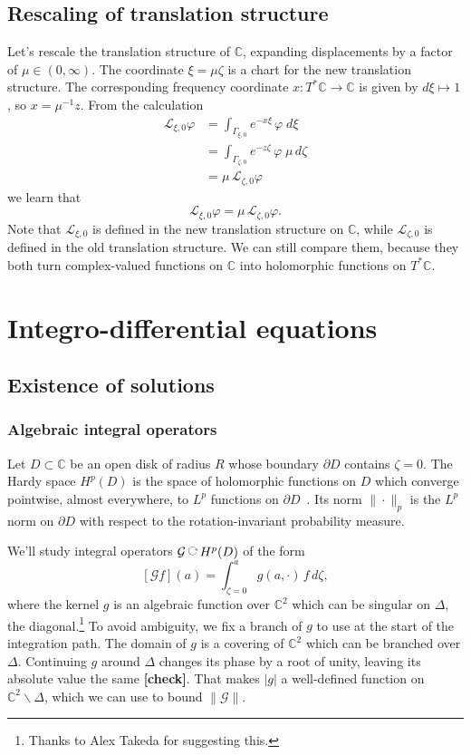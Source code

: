 \documentclass{article}
\theoremstyle{plain}
\newcommand{\maps}{\colon}
\newcommand{\acts}{\mathbin{\raisebox{\depth}{\rotatebox{-90}{$\circlearrowright$}}}}
\newcommand{\C}{\mathbb{C}}
\newcommand{\laplace}{\mathcal{L}}
\begin{document}
\subsection{Rescaling of translation structure}
Let's rescale the translation structure of $\C$, expanding displacements by a factor of $\mu \in (0, \infty)$. The coordinate $\xi = \mu\zeta$ is a chart for the new translation structure. The corresponding frequency coordinate $x \maps T^*\C \to \C$ is given by $d\xi \mapsto 1$, so $x = \mu^{-1} z$. From the calculation
\begin{align*}
\laplace_{\xi, 0} \varphi & = \int_{\Gamma_{\xi, 0}} e^{-x\xi}\,\varphi\;d\xi \\
& = \int_{\Gamma_{\zeta, 0}} e^{-z \zeta}\,\varphi\;\mu\,d\zeta \\
& = \mu\,\laplace_{\zeta, 0} \varphi
\end{align*}
we learn that
\[ \laplace_{\xi, 0} \varphi = \mu\,\laplace_{\zeta, 0} \varphi. \]
Note that $\laplace_{\xi, 0}$ is defined in the new translation structure on $\C$, while $\laplace_{\zeta, 0}$ is defined in the old translation structure. We can still compare them, because they both turn complex-valued functions on $\C$ into holomorphic functions on $T^*\C$.
\section{Integro-differential equations}
\subsection{Existence of solutions}
\subsubsection{Algebraic integral operators}
Let $D \subset \C$ be an open disk of radius $R$ whose boundary $\partial D$ contains $\zeta = 0$. The Hardy space $H^p(D)$ is the space of holomorphic functions on $D$ which converge pointwise, almost everywhere, to $L^p$ functions on $\partial D$~\cite[Theorem~3.8]{intro-harmonic}. Its norm $\|\cdot\|_p$ is the $L^p$ norm on $\partial D$ with respect to the rotation-invariant probability measure.

We'll study integral operators $\mathcal{G} \acts H^p(D)$ of the form
\[ [\mathcal{G}f](a) = \int_{\zeta = 0}^{a} g(a, \cdot)\,f\,d\zeta, \]
where the kernel $g$ is an algebraic function over $\C^2$ which can be singular on $\Delta$, the diagonal.\footnote{Thanks to Alex Takeda for suggesting this.} To avoid ambiguity, we fix a branch of $g$ to use at the start of the integration path. The domain of $g$ is a covering of $\C^2$ which can be branched over $\Delta$. Continuing $g$ around $\Delta$ changes its phase by a root of unity, leaving its absolute value the same \textbf{[check]}. That makes $|g|$ a well-defined function on $\C^2 \smallsetminus \Delta$, which we can use to bound $\|\mathcal{G}\|$.
\end{document}
